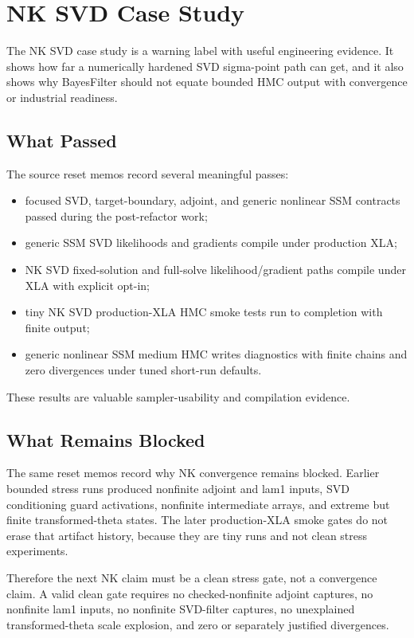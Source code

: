 \chapter{NK SVD Case Study}
\label{ch:bf-nk-svd-case-study}

The NK SVD case study is a warning label with useful engineering evidence.  It
shows how far a numerically hardened SVD sigma-point path can get, and it also
shows why BayesFilter should not equate bounded HMC output with convergence or
industrial readiness.

\section{What Passed}
\label{sec:bf-nk-svd-passed}

The source reset memos record several meaningful passes:
\begin{itemize}
  \item focused SVD, target-boundary, adjoint, and generic nonlinear SSM
    contracts passed during the post-refactor work;
  \item generic SSM SVD likelihoods and gradients compile under production XLA;
  \item NK SVD fixed-solution and full-solve likelihood/gradient paths compile
    under XLA with explicit opt-in;
  \item tiny NK SVD production-XLA HMC smoke tests run to completion with finite
    output;
  \item generic nonlinear SSM medium HMC writes diagnostics with finite chains
    and zero divergences under tuned short-run defaults.
\end{itemize}
These results are valuable sampler-usability and compilation evidence.

\section{What Remains Blocked}
\label{sec:bf-nk-svd-blocked}

The same reset memos record why NK convergence remains blocked.  Earlier
bounded stress runs produced nonfinite adjoint and lam1 inputs, SVD conditioning
guard activations, nonfinite intermediate arrays, and extreme but finite
transformed-theta states.  The later production-XLA smoke gates do not erase
that artifact history, because they are tiny runs and not clean stress
experiments.

Therefore the next NK claim must be a clean stress gate, not a convergence
claim.  A valid clean gate requires no checked-nonfinite adjoint captures, no
nonfinite lam1 inputs, no nonfinite SVD-filter captures, no unexplained
transformed-theta scale explosion, and zero or separately justified divergences.

